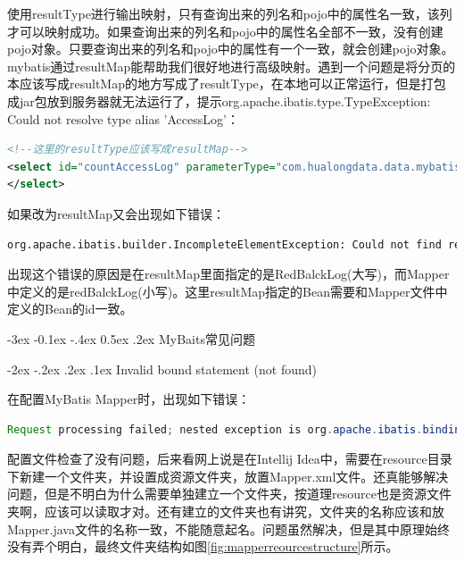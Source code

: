 \documentclass[12pt]{book}
\makeatletter
\numberwithin{dummy}{section}
\theoremstyle{ocrenumbox}
\theoremstyle{blacknumex}
\theoremstyle{blacknumbox}
\theoremstyle{ocrenum}
\renewcommand{\subsection}{\@startsection {subsection}{2}{\z@}
	{-3ex \@plus -0.1ex \@minus -.4ex}
	{0.5ex \@plus.2ex }
	{\normalfont\sffamily\bfseries}}
\renewcommand\paragraph{\@startsection{paragraph}{4}{\z@}
	{-2ex \@plus-.2ex \@minus .2ex}
	{.1ex}
	{\normalfont\small\sffamily\bfseries}}
\makeatother
\begin{document}
使用resultType进行输出映射，只有查询出来的列名和pojo中的属性名一致，该列才可以映射成功。如果查询出来的列名和pojo中的属性名全部不一致，没有创建pojo对象。只要查询出来的列名和pojo中的属性有一个一致，就会创建pojo对象。mybatis通过resultMap能帮助我们很好地进行高级映射。遇到一个问题是将分页的本应该写成resultMap的地方写成了resultType，在本地可以正常运行，但是打包成jar包放到服务器就无法运行了，提示org.apache.ibatis.type.TypeException: Could not resolve type alias 'AccessLog'：

\begin{lstlisting}[language=XML]
<!--这里的resultType应该写成resultMap-->
<select id="countAccessLog" parameterType="com.hualongdata.data.mybatis.Pageable" resultType="AccessLog">
</select>
\end{lstlisting}

如果改为resultMap又会出现如下错误：


\begin{lstlisting}[language=XML]
org.apache.ibatis.builder.IncompleteElementException: Could not find result map creditsystem.data.mapper.RedBalckLogMapper.RedBalckLog
\end{lstlisting}

出现这个错误的原因是在resultMap里面指定的是RedBalckLog(大写)，而Mapper中定义的是redBalckLog(小写)。这里resultMap指定的Bean需要和Mapper文件中定义的Bean的id一致。

\subsection{MyBaits常见问题}

\paragraph{Invalid bound statement (not found)}

在配置MyBatis Mapper时，出现如下错误：

\begin{lstlisting}[language=Java]
Request processing failed; nested exception is org.apache.ibatis.binding.BindingException: Invalid bound statement (not found)
\end{lstlisting}

配置文件检查了没有问题，后来看网上说是在Intellij Idea中，需要在resource目录下新建一个文件夹，并设置成资源文件夹，放置Mapper.xml文件。还真能够解决问题，但是不明白为什么需要单独建立一个文件夹，按道理resource也是资源文件夹啊，应该可以读取才对。还有建立的文件夹也有讲究，文件夹的名称应该和放Mapper.java文件的名称一致，不能随意起名。问题虽然解决，但是其中原理始终没有弄个明白，最终文件夹结构如图\ref{fig:mapperreourcestructure}所示。
\end{document}
